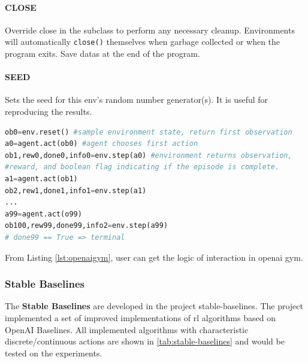 \paragraph{CLOSE} Override close in the subclass to perform any necessary cleanup. Environments will automatically \texttt{close()} themselves when garbage collected or when the program exits. Save datas at the end of the program.
\paragraph{SEED} Sets the seed for this env's random number generator(s). It is useful for reproducing the results.
\begin{lstlisting}[caption={Logic of \gls{openai gym} Interaction},label={lst:openaigym},language=python]
ob0=env.reset() #sample environment state, return first observation
a0=agent.act(ob0) #agent chooses first action
ob1,rew0,done0,info0=env.step(a0) #environment returns observation,
#reward, and boolean flag indicating if the episode is complete.
a1=agent.act(ob1)
ob2,rew1,done1,info1=env.step(a1)
...
a99=agent.act(o99)
ob100,rew99,done99,info2=env.step(a99)
# done99 == True => terminal
\end{lstlisting}

From Listing \ref{lst:openaigym}, user can get the logic of interaction in \gls{openai gym}.

\subsubsection{Stable Baselines} \label{backgrounds:stable-baselines}
The \textbf{Stable Baselines} are developed in the project stable-baselines\parencite{stable-baselines}. The project implemented a set of improved implementations of \gls{rl} algorithms based on OpenAI Baselines\parencite{baselines}. All implemented algorithms with characteristic discrete/continuous actions are shown in \ref{tab:stable-baselines} and would be tested on the experiments.

